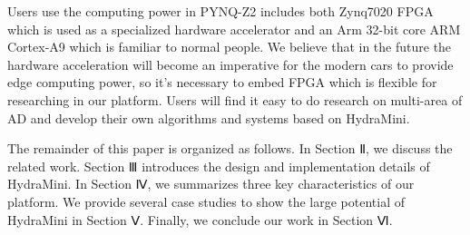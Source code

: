 Users use the computing power in PYNQ-Z2 includes both Zynq7020 FPGA\cite{zynq} which is used as a specialized hardware accelerator and an Arm 32-bit core ARM Cortex-A9 which is familiar to normal people. We believe that in the future the hardware acceleration will become an imperative for the modern cars to provide edge computing power, so it's necessary to embed FPGA which is flexible for researching in our platform. Users will find it easy to do research on multi-area of AD and develop their own algorithms and systems based on HydraMini.

The remainder of this paper is organized as follows. In Section Ⅱ, we discuss the related work. Section Ⅲ introduces the design and implementation details of HydraMini. In Section Ⅳ, we summarizes three key characteristics of our platform. We provide several case studies to show the large potential of HydraMini in Section Ⅴ. Finally, we conclude our work in Section Ⅵ.